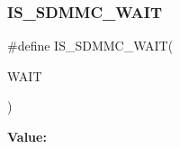 \subsubsection{\texorpdfstring{IS\_SDMMC\_WAIT}{IS\_SDMMC\_WAIT}}
{\footnotesize\ttfamily \#define I\+S\+\_\+\+S\+D\+M\+M\+C\+\_\+\+W\+A\+IT(\begin{DoxyParamCaption}\item[{}]{W\+A\+IT }\end{DoxyParamCaption})}

{\bfseries Value\+:}
\begin{DoxyCode}{0}

\end{DoxyCode}
